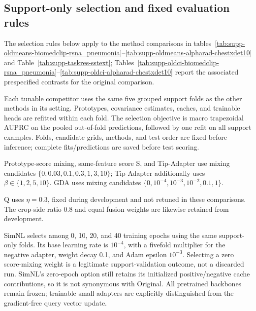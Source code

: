 

\subsection{Support-only selection and fixed evaluation rules}
\label{supp:selection}
The selection rules below apply to the method comparisons in tables~\ref{tab:supp-oldmeans-biomedclip-rsna_pneumonia}--\ref{tab:supp-oldmeans-alpharad-chestxdet10} and Table~\ref{tab:supp-taskres-sstext}; Tables~\ref{tab:supp-oldci-biomedclip-rsna_pneumonia}--\ref{tab:supp-oldci-alpharad-chestxdet10} report the associated prespecified contrasts for the original comparison.

Each tunable competitor uses the same five grouped support folds as the other methods in its setting. Prototypes, covariance estimates, caches, and trainable heads are refitted within each fold. The selection objective is macro trapezoidal AUPRC on the pooled out-of-fold predictions, followed by one refit on all support examples. 
 Folds, candidate grids, methods, and test order are fixed before inference; complete fits/predictions are saved before test scoring.

Prototype-score mixing, same-feature score S, and Tip-Adapter use mixing candidates $\{0,0.03,0.1,0.3,1,3,10\}$; Tip-Adapter additionally uses $\beta\in\{1,2,5,10\}$. GDA uses mixing candidates $\{0,10^{-4},10^{-3},10^{-2},0.1,1\}$. 
 
 Q uses $\eta=0.3$, fixed during development and not retuned in these comparisons. The crop-side ratio 0.8 and equal fusion weights are likewise retained from development. 


SimNL selects among 0, 10, 20, and 40 training epochs using the same support-only folds. Its base learning rate is $10^{-4}$, with a fivefold multiplier for the negative adapter, weight decay 0.1, and Adam epsilon $10^{-3}$. Selecting a zero score-mixing weight is a legitimate support-validation outcome, not a discarded run. SimNL's zero-epoch option still retains its initialized positive/negative cache contributions, so it is not synonymous with Original. All pretrained backbones remain frozen; trainable small adapters are explicitly distinguished from the gradient-free query vector update.

